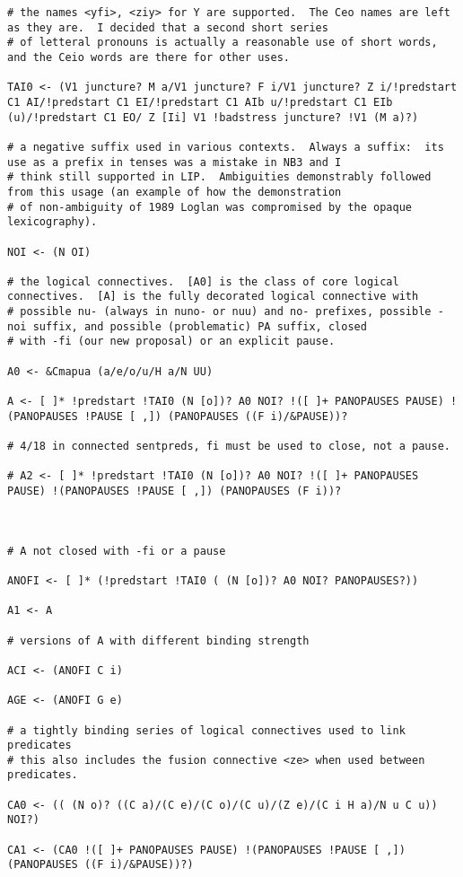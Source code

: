 \documentclass[12pt]{book}
\begin{document}
{\begin{verbatim}
# the names <yfi>, <ziy> for Y are supported.  The Ceo names are left as they are.  I decided that a second short series
# of letteral pronouns is actually a reasonable use of short words, and the Ceio words are there for other uses.

TAI0 <- (V1 juncture? M a/V1 juncture? F i/V1 juncture? Z i/!predstart C1 AI/!predstart C1 EI/!predstart C1 AIb u/!predstart C1 EIb (u)/!predstart C1 EO/ Z [Ii] V1 !badstress juncture? !V1 (M a)?)

# a negative suffix used in various contexts.  Always a suffix:  its use as a prefix in tenses was a mistake in NB3 and I 
# think still supported in LIP.  Ambiguities demonstrably followed from this usage (an example of how the demonstration
# of non-ambiguity of 1989 Loglan was compromised by the opaque lexicography).

NOI <- (N OI)

# the logical connectives.  [A0] is the class of core logical connectives.  [A] is the fully decorated logical connective with
# possible nu- (always in nuno- or nuu) and no- prefixes, possible -noi suffix, and possible (problematic) PA suffix, closed
# with -fi (our new proposal) or an explicit pause.

A0 <- &Cmapua (a/e/o/u/H a/N UU)

A <- [ ]* !predstart !TAI0 (N [o])? A0 NOI? !([ ]+ PANOPAUSES PAUSE) !(PANOPAUSES !PAUSE [ ,]) (PANOPAUSES ((F i)/&PAUSE))?

# 4/18 in connected sentpreds, fi must be used to close, not a pause.

# A2 <- [ ]* !predstart !TAI0 (N [o])? A0 NOI? !([ ]+ PANOPAUSES PAUSE) !(PANOPAUSES !PAUSE [ ,]) (PANOPAUSES (F i))?



# A not closed with -fi or a pause

ANOFI <- [ ]* (!predstart !TAI0 ( (N [o])? A0 NOI? PANOPAUSES?))

A1 <- A

# versions of A with different binding strength

ACI <- (ANOFI C i)

AGE <- (ANOFI G e)

# a tightly binding series of logical connectives used to link predicates
# this also includes the fusion connective <ze> when used between predicates.

CA0 <- (( (N o)? ((C a)/(C e)/(C o)/(C u)/(Z e)/(C i H a)/N u C u)) NOI?)

CA1 <- (CA0 !([ ]+ PANOPAUSES PAUSE) !(PANOPAUSES !PAUSE [ ,]) (PANOPAUSES ((F i)/&PAUSE))?)


\end{verbatim}}
\end{document}
